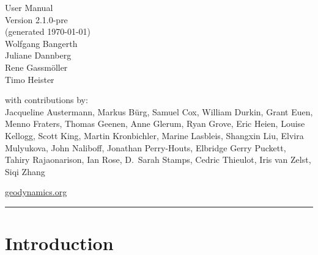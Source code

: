\documentclass{article}
\begin{document}
{%
\color{dark_grey}
\hfill{\Huge \fontfamily{\sfdefault}\selectfont User Manual \\
\raggedleft \huge \fontfamily{\sfdefault}\selectfont Version
2.1.0-pre %
\\\large(generated \today)\\
{\Large Wolfgang Bangerth\\Juliane Dannberg\\Rene Gassm{\"o}ller\\Timo Heister\\}
}

\null
\vspace{17em}
\color{dark_grey}
{\fontfamily{\sfdefault}\selectfont
\large
\noindent with contributions by: \\
    Jacqueline Austermann,
    Markus B{\"u}rg,
    Samuel Cox,
    William Durkin,
    Grant Euen,
    Menno Fraters,
    Thomas Geenen,
    Anne Glerum,
    Ryan Grove,
    Eric Heien,
    Louise Kellogg,
    Scott King,
    Martin Kronbichler,
    Marine Lasbleis,
    Shangxin Liu,
    Elvira Mulyukova,
    John Naliboff,
    Jonathan Perry-Houts,
    Elbridge Gerry Puckett,
    Tahiry Rajaonarison,
    Ian Rose,
    D.~Sarah Stamps,
    Cedric Thieulot,
    Iris van Zelst,
    Siqi Zhang \\
\vspace{1.0em}
}

{\noindent
{\fontfamily{\sfdefault}\selectfont \href{https://geodynamics.org}{geodynamics.org}}
}

{\noindent
\color{dark_grey}
\rule{\textwidth}{2pt}
}

}

\pagebreak
{}


\pagebreak

\tableofcontents

\pagebreak

\section{Introduction}
\end{document}
